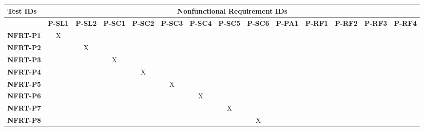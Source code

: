 \documentclass[12pt, titlepage]{article}
\begin{document}
\begin{landscape}
\begin{longtable}{|l|ccccccccccccc|}
  \hline
  \textbf{Test IDs} & \multicolumn{13}{c|}{\textbf{Nonfunctional Requirement IDs}} \\
  \hline
  ~                 & \textbf{P-SL1} & \textbf{P-SL2} & \textbf{P-SC1} & \textbf{P-SC2} & \textbf{P-SC3} & \textbf{P-SC4} & \textbf{P-SC5} & \textbf{P-SC6} & \textbf{P-PA1} & \textbf{P-RF1} & \textbf{P-RF2} & \textbf{P-RF3} & \textbf{P-RF4} \\
  \hline
  \textbf{NFRT-P1}  & X              & ~              & ~              & ~              & ~              & ~              & ~              & ~              & ~              & ~              & ~              & ~              & ~              \\
  \textbf{NFRT-P2}  & ~              & X              & ~              & ~              & ~              & ~              & ~              & ~              & ~              & ~              & ~              & ~              & ~              \\
  \textbf{NFRT-P3}  & ~              & ~              & X              & ~              & ~              & ~              & ~              & ~              & ~              & ~              & ~              & ~              & ~              \\
  \textbf{NFRT-P4}  & ~              & ~              & ~              & X              & ~              & ~              & ~              & ~              & ~              & ~              & ~              & ~              & ~              \\
  \textbf{NFRT-P5}  & ~              & ~              & ~              & ~              & X              & ~              & ~              & ~              & ~              & ~              & ~              & ~              & ~              \\
  \textbf{NFRT-P6}  & ~              & ~              & ~              & ~              & ~              & X              & ~              & ~              & ~              & ~              & ~              & ~              & ~              \\
  \textbf{NFRT-P7}  & ~              & ~              & ~              & ~              & ~              & ~              & X              & ~              & ~              & ~              & ~              & ~              & ~              \\
  \textbf{NFRT-P8}  & ~              & ~              & ~              & ~              & ~              & ~              & ~              & X              & ~              & ~              & ~              & ~              & ~              \\

\end{longtable}
\end{landscape}
\end{document}
